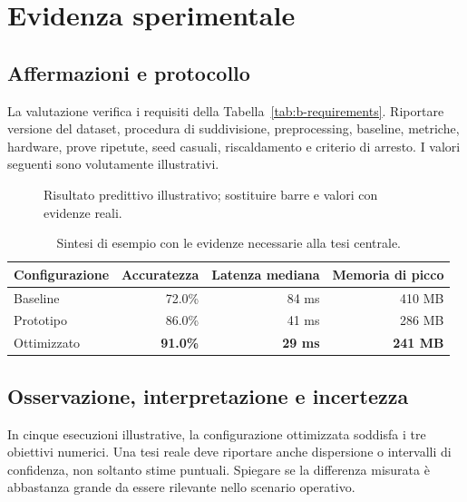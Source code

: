 \chapter{Evidenza sperimentale}\label{ch:b-evaluation}
\section{Affermazioni e protocollo}
La valutazione verifica i requisiti della Tabella~\ref{tab:b-requirements}. Riportare versione del dataset, procedura di suddivisione, preprocessing, baseline, metriche, hardware, prove ripetute, seed casuali, riscaldamento e criterio di arresto. I valori seguenti sono volutamente illustrativi.

\begin{figure}[htbp]
\centering
\begin{minipage}{0.82\textwidth}
\end{minipage}
\caption{Risultato predittivo illustrativo; sostituire barre e valori con evidenze reali.}
\label{fig:b-results}
\end{figure}

\begin{table}[htbp]
\centering
\caption{Sintesi di esempio con le evidenze necessarie alla tesi centrale.}
\label{tab:b-results}
\begin{tabularx}{0.88\textwidth}{Yrrr}
\toprule
Configurazione & Accuratezza & Latenza mediana & Memoria di picco\\
\midrule
Baseline & 72.0\% & 84 ms & 410 MB\\
Prototipo & 86.0\% & 41 ms & 286 MB\\
Ottimizzato & \textbf{91.0\%} & \textbf{29 ms} & \textbf{241 MB}\\
\bottomrule
\end{tabularx}
\end{table}

\section{Osservazione, interpretazione e incertezza}
In cinque esecuzioni illustrative, la configurazione ottimizzata soddisfa i tre obiettivi numerici. Una tesi reale deve riportare anche dispersione o intervalli di confidenza, non soltanto stime puntuali. Spiegare se la differenza misurata è abbastanza grande da essere rilevante nello scenario operativo.

